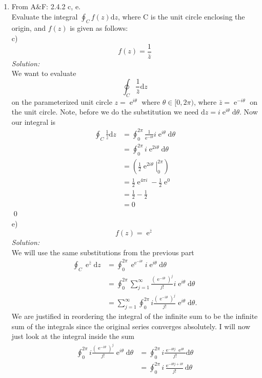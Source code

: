 \documentclass[10pt]{amsart}
\newcommand{\D}{\mathrm{d}}
\DeclareMathOperator{\E}{e}
\theoremstyle{nonumberplain}
\begin{document}
\begin{enumerate}[label={\bf {\arabic*}:}]
\item From A\&F: 2.4.2 c, e.\\
Evaluate the integral $\oint_Cf(z)\D z$, where C is the unit circle enclosing the origin, and $f(z)$ is given as follows: \\
c) $$f(z) = \frac {1} {\bar z}$$
\textit{Solution:} \\
We want to evaluate
$$
\oint_C\frac {1} {\bar z} \D z
$$
on the parameterized unit circle $z = \E^{i\theta}$ where $\theta \in [0, 2\pi)$, where $\bar z = \E^{-i\theta}$ on the unit circle.
Note, before we do the substitution we need $\D z = i\E^{i\theta} \D \theta$. Now our integral is
\begin{align*}
\oint_C\frac {1} {\bar z} \D z &= \oint_0^{2\pi}\frac {1} {\E^{-i\theta}} i\E^{i \theta}\D \theta \\
					  &= \oint_0^{2\pi} i \E^{2i \theta} \D \theta \\
					  &= \left( \left. \frac 1 2 \E^{2i\theta} \right|_0^{2\pi}\right) \\
					  &= \frac 1 2 \E^{4\pi i} - \frac 1 2 \E^{0} \\
					  &= \frac 1 2 - \frac 1 2 \\
					  &= 0
\end{align*}
\qed
\\
e) $$f(z) = \E^{\bar z}$$
\textit{Solution:} \\
We will use the same substitutions from the previous part
\begin{align*}
\oint_C\E^{\bar z} \D z &= \oint_0^{2\pi}\E^{\E^{-i\theta}} i\E^{i \theta}\D \theta \\
				  &= \oint_0^{2\pi} \sum_{j=1}^{\infty} \frac{\left(\E^{-i\theta}\right)^j}{j!} i\E^{i\theta} \D \theta \\
				  &= \sum_{j=1}^{\infty} \oint_0^{2\pi} i \frac{\left(\E^{-i\theta}\right)^j}{j!} {\E^{i\theta}} \D \theta.
\end{align*}
We are justified in reordering the integral of the infinite sum to be the infinite sum of the integrals since the original series converges absolutely.
I will now just look at the integral inside the sum
\begin{align*}
\oint_0^{2\pi} i \frac{\left(\E^{-i\theta}\right)^j}{j!} {\E^{i\theta}} \D \theta &= \oint_0^{2\pi} i \frac{\E^{-i\theta j}\E^{i\theta}}{j!} \D \theta \\
	&= \oint_0^{2\pi} i \frac{\E^{-i\theta j + i\theta}}{j!} \D \theta \\

\end{align*}
\end{enumerate}
\end{document}
